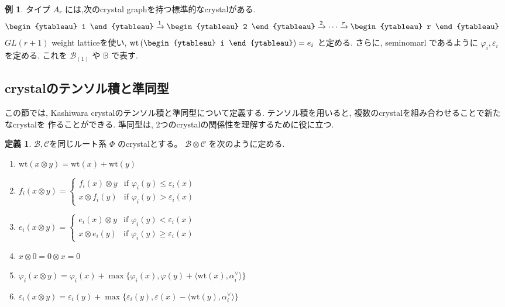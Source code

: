 \documentclass[
  a4paper, 
  12pt,
  ja=standard,
  xelatex,
  left=30truemm,
  right=30truemm,
  titlepage 
]{bxjsarticle}
\theoremstyle{definition}
\newtheorem{df}{定義}
\newtheorem*{ex}{例}
\begin{document}
\begin{ex}
  タイプ $A_r$ には,次のcrystal graphを持つ標準的なcrystalがある.
  \[
  \begin{aligned}
      \vcenter{\hbox{\begin{ytableau} 1 \end{ytableau}}}
      &\xrightarrow{1}
      \vcenter{\hbox{\begin{ytableau} 2 \end{ytableau}}}
      \xrightarrow{2}
      \cdots
      \xrightarrow{r}
      \vcenter{\hbox{\begin{ytableau} r \end{ytableau}}}
  \end{aligned}
  \]
  $GL(r+1)$ weight latticeを使い, $\mathrm{wt} \left( \vcenter{\hbox{\begin{ytableau} i \end{ytableau}}} \right) = e_i$ と定める.
  さらに, seminomarl であるように $\varphi_i, \varepsilon_i$ を定める. これを $\mathscr{B}_{(1)}$ や $\mathbb{B}$ で表す.
\end{ex}

%
\subsection{crystalのテンソル積と準同型}
この節では, Kashiwara crystalのテンソル積と準同型について定義する. テンソル積を用いると, 複数のcrystalを組み合わせることで新たなcrystalを
作ることができる. 準同型は, 2つのcrystalの関係性を理解するために役に立つ.
\bigskip

\begin{df}
  $\mathscr{B}, \mathscr{C}$を同じルート系 $\Phi$ のcrystalとする。
  $\mathscr{B} \otimes \mathscr{C}$ を次のように定める.
  \begin{enumerate}
    \item $\mathrm{wt}(x \otimes y) = \mathrm{wt}(x) + \mathrm{wt}(y)$
    \item $f_i(x \otimes y) = 
    \begin{cases} 
      f_i(x) \otimes y & \text{if } \varphi_i(y) \leq \varepsilon_i(x) \\
      x \otimes f_i(y) & \text{if } \varphi_i(y) > \varepsilon_i(x)
    \end{cases}$
    \item $e_i(x \otimes y) = 
    \begin{cases} 
      e_i(x) \otimes y & \text{if } \varphi_i(y) < \varepsilon_i(x) \\
      x \otimes e_i(y) & \text{if } \varphi_i(y) \geq \varepsilon_i(x)
    \end{cases}$
    \item $x \otimes 0 = 0 \otimes x = 0$
    \item $\varphi_i(x \otimes y) = \varphi_i(x) + \max\{ \varphi_i(x), \varphi(y) + \langle \mathrm{wt}(x), \alpha_i^{ \vee } \rangle \} $
    \item $\varepsilon_i(x \otimes y) = \varepsilon_i(y) + \max\{ \varepsilon_i(y), \varepsilon(x) - \langle \mathrm{wt}(y), \alpha_i^{ \vee } \rangle \} $
  \end{enumerate}
\end{df}
\end{document}

